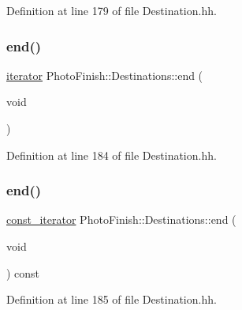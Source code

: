 Definition at line 179 of file Destination.\+hh.

\mbox{\label{class_photo_finish_1_1_destinations_a023eba4bedf55d90fff1d0d723d942f9}} 
\subsubsection{\texorpdfstring{end()}{end()}\hspace{0.1cm}{\footnotesize\ttfamily [1/2]}}
{\footnotesize\ttfamily \hyperlink{class_photo_finish_1_1_destinations_adb2cf9240b0d2545643caa2c1d718913}{iterator} Photo\+Finish\+::\+Destinations\+::end (\begin{DoxyParamCaption}\item[{void}]{ }\end{DoxyParamCaption})\hspace{0.3cm}{\ttfamily [inline]}}



Definition at line 184 of file Destination.\+hh.

\mbox{\label{class_photo_finish_1_1_destinations_a55aefa8640e5e04c2feb9f88a42504c6}} 
\subsubsection{\texorpdfstring{end()}{end()}\hspace{0.1cm}{\footnotesize\ttfamily [2/2]}}
{\footnotesize\ttfamily \hyperlink{class_photo_finish_1_1_destinations_a267e114a259d98ae440074660c7086cb}{const\+\_\+iterator} Photo\+Finish\+::\+Destinations\+::end (\begin{DoxyParamCaption}\item[{void}]{ }\end{DoxyParamCaption}) const\hspace{0.3cm}{\ttfamily [inline]}}



Definition at line 185 of file Destination.\+hh.

\mbox{\label{class_photo_finish_1_1_destinations_a00b26ae3f504ad19f80b07486a2fc641}} 
